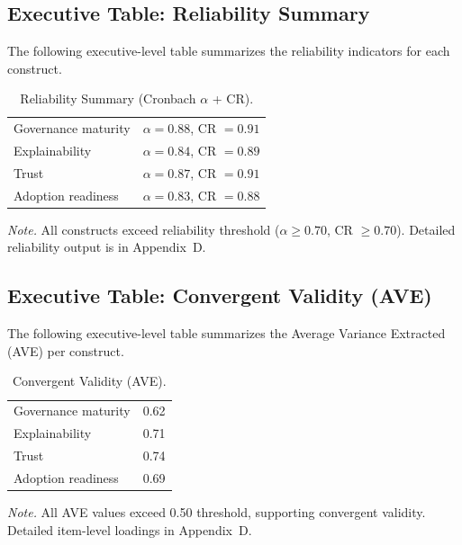 \subsection{Executive Table: Reliability Summary}
\label{sec:exec_reliability}

\noindent The following executive-level table summarizes the reliability indicators for each construct.

{\tablestripes\tablefontsize
{}
\begin{xltabular}{\textwidth}{@{} >{\raggedright\arraybackslash}p{6cm} L @{}}
\caption[Reliability Summary (Cronbach $\alpha$ + CR)]{Reliability Summary (Cronbach $\alpha$ + CR).}\label{tab:exec_reliability} \\
\toprule
{} &  \\
\midrule
\endfirsthead
\endhead
\bottomrule
\endlastfoot
Governance maturity & $\alpha = 0.88$, CR $= 0.91$ \\
\addlinespace
Explainability & $\alpha = 0.84$, CR $= 0.89$ \\
\addlinespace
Trust & $\alpha = 0.87$, CR $= 0.91$ \\
\addlinespace
Adoption readiness & $\alpha = 0.83$, CR $= 0.88$ \\
\end{xltabular}}
\vspace{0.3em}\noindent\textit{Note.} All constructs exceed reliability threshold ($\alpha \geq 0.70$, CR $\geq 0.70$). Detailed reliability output is in Appendix~D.


\subsection{Executive Table: Convergent Validity (AVE)}
\label{sec:exec_convergent_validity}

\noindent The following executive-level table summarizes the Average Variance Extracted (AVE) per construct.

{\tablestripes\tablefontsize
{}
\begin{xltabular}{\textwidth}{@{} >{\raggedright\arraybackslash}p{6cm} L @{}}
\caption[Convergent Validity (AVE)]{Convergent Validity (AVE).}\label{tab:exec_convergent_validity} \\
\toprule
{} &  \\
\midrule
\endfirsthead
\endhead
\bottomrule
\endlastfoot
Governance maturity & 0.62 \\
\addlinespace
Explainability & 0.71 \\
\addlinespace
Trust & 0.74 \\
\addlinespace
Adoption readiness & 0.69 \\
\end{xltabular}}
\vspace{0.3em}\noindent\textit{Note.} All AVE values exceed 0.50 threshold, supporting convergent validity. Detailed item-level loadings in Appendix~D.


